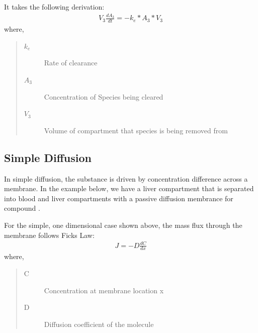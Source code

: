 \documentclass[letterpaper,10pt,english]{sphinxmanual}
\let\sphinxpxdimen\pdfpxdimen\else\newdimen\sphinxpxdimen
\begin{document}
\sphinxAtStartPar
It takes the following derivation:
\begin{equation*}
\begin{split}V_3 \frac{dA_3}{dt} = -k_e * A_3 * V_3\end{split}
\end{equation*}
\sphinxAtStartPar
where,
\begin{quote}\begin{description}
\item[{\(k_e\)}] \leavevmode
\sphinxAtStartPar
Rate of clearance

\item[{\(A_3\)}] \leavevmode
\sphinxAtStartPar
Concentration of Species being cleared

\item[{\(V_3\)}] \leavevmode
\sphinxAtStartPar
Volume of compartment that species is being removed from

\end{description}\end{quote}


\subsection{Simple Diffusion}
\label{\detokenize{pages/backend/io_info/5_simple_diffusion:simple-diffusion}}\label{\detokenize{pages/backend/io_info/5_simple_diffusion::doc}}
\sphinxAtStartPar
In simple diffusion, the substance is driven by concentration difference across
a membrane. In the example below, we have a liver compartment that is
separated into blood and liver compartments with a passive diffusion
membrance for compound .

\begin{figure}[htbp]
\centering

\noindent\sphinxincludegraphics[width=400\sphinxpxdimen,height=200\sphinxpxdimen]{{simple_diffusion}.png}
\end{figure}

\sphinxAtStartPar
For the simple, one dimensional case shown above,
the mass flux through the membrane follows Ficks Law:
\begin{equation*}
\begin{split}J = -D \frac{dC}{dx}\end{split}
\end{equation*}
\sphinxAtStartPar
where,
\begin{quote}\begin{description}
\item[{C}] \leavevmode
\sphinxAtStartPar
Concentration at membrane location x

\item[{D}] \leavevmode
\sphinxAtStartPar
Diffusion coefficient of the molecule

\end{description}\end{quote}
\end{document}
